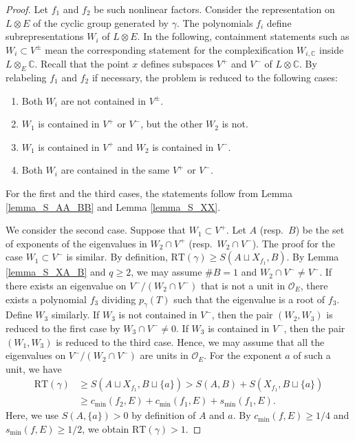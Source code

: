 \documentclass[11pt]{amsart}
\theoremstyle{plain}
\theoremstyle{definition}
\numberwithin{equation}{section}
\def\OO{\mathscr{O}}
\newcommand{\bbC}{\mathbb{C}}
\begin{document}
\begin{proof}
  Let $f_1$ and $f_2$ be such nonlinear factors.
  Consider the representation on $L \otimes E$ of the cyclic group generated by $\gamma$.
  The polynomials $f_i$ define subrepresentations $W_i$ of $L \otimes E$.
  In the following, containment statements such as $W_i\subset V^\pm$ mean the corresponding statement for the complexification $W_{i,\bbC}$ inside $L\otimes_{E}\bbC$.
  Recall that the point $x$ defines subspaces $V^+$ and $V^-$ of $L \otimes \bbC$.
  By relabeling $f_1$ and $f_2$ if necessary, the problem is reduced to the following cases:
  \begin{enumerate}
    \item Both $W_i$ are not contained in $V^{\pm}$.
    \item $W_1$ is contained in $V^+$ or $V^-$, but the other $W_2$ is not.
    \item $W_1$ is contained in $V^+$ and $W_2$ is contained in $V^-$.
    \item Both $W_i$ are contained in the same $V^+$ or $V^-$.
  \end{enumerate}
  For the first and the third cases, the statements follow from Lemma \ref{lemma_S_AA_BB} and Lemma \ref{lemma_S_XX}.

  We consider the second case.
  Suppose that $W_1 \subset V^+$.
  Let $A$ (resp.\ $B$) be the set of exponents of the eigenvalues in $W_2 \cap V^+$ (resp.\ $W_2 \cap V^-$).
  The proof for the case $W_1 \subset V^-$ is similar.
  By definition, $\mathrm{RT}(\gamma) \geq S(A \sqcup X_{f_1}, B)$.
  By Lemma \ref{lemma_S_XA_B} and $q \geq 2$, we may assume $\#
  B = 1$ and $W_2 \cap V^- \neq V^-$.
  If there exists an eigenvalue on $V^- / (W_2 \cap V^-)$ that is not a unit in $\OO_E$, there exists a polynomial $f_3$ dividing $p_\gamma(T)$ such that the eigenvalue is a root of $f_3$.
  Define $W_3$ similarly.
  If $W_3$ is not contained in $V^-$, then the pair $(W_2, W_3)$ is reduced to the first case by $W_3 \cap V^- \neq 0$. 
  If $W_3$ is contained in $V^-$, then the pair $(W_1, W_3)$ is reduced to the third case.
  Hence, we may assume that all the eigenvalues on $V^- / (W_2 \cap V^-)$ are units in $\OO_E$.
  For the exponent $a$ of such a unit, we have
  \begin{align*}
    \mathrm{RT}(\gamma) &\geq S(A \sqcup X_{f_1}, B \sqcup \{a\}) > S(A,B) + S(X_{f_1}, B \sqcup \{a\})\\
    &\geq c_{\min}(f_2, E) + c_{\min}(f_1,E) + s_{\min}(f_1,E).
  \end{align*}
  Here, we use $S(A,\{a\}) > 0$ by definition of $A$ and $a$.
  By $c_{\min}(f,E) \geq 1/4$ and $s_{\min}(f,E) \geq 1/2$, we obtain $\mathrm{RT}(\gamma) > 1$.


\end{proof}
\end{document}
